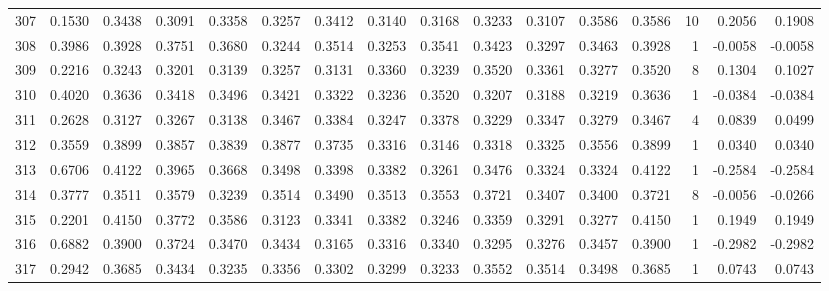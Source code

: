 \begin{tabular}{lrrrrrrrrrrrrrrr}
307 &      0.1530 &  0.3438 &  0.3091 &  0.3358 &  0.3257 &  0.3412 &  0.3140 &  0.3168 &  0.3233 &  0.3107 &   0.3586 &     0.3586 &     10 &                    0.2056 &                     0.1908 \\
308 &      0.3986 &  0.3928 &  0.3751 &  0.3680 &  0.3244 &  0.3514 &  0.3253 &  0.3541 &  0.3423 &  0.3297 &   0.3463 &     0.3928 &      1 &                   -0.0058 &                    -0.0058 \\
309 &      0.2216 &  0.3243 &  0.3201 &  0.3139 &  0.3257 &  0.3131 &  0.3360 &  0.3239 &  0.3520 &  0.3361 &   0.3277 &     0.3520 &      8 &                    0.1304 &                     0.1027 \\
310 &      0.4020 &  0.3636 &  0.3418 &  0.3496 &  0.3421 &  0.3322 &  0.3236 &  0.3520 &  0.3207 &  0.3188 &   0.3219 &     0.3636 &      1 &                   -0.0384 &                    -0.0384 \\
311 &      0.2628 &  0.3127 &  0.3267 &  0.3138 &  0.3467 &  0.3384 &  0.3247 &  0.3378 &  0.3229 &  0.3347 &   0.3279 &     0.3467 &      4 &                    0.0839 &                     0.0499 \\
312 &      0.3559 &  0.3899 &  0.3857 &  0.3839 &  0.3877 &  0.3735 &  0.3316 &  0.3146 &  0.3318 &  0.3325 &   0.3556 &     0.3899 &      1 &                    0.0340 &                     0.0340 \\
313 &      0.6706 &  0.4122 &  0.3965 &  0.3668 &  0.3498 &  0.3398 &  0.3382 &  0.3261 &  0.3476 &  0.3324 &   0.3324 &     0.4122 &      1 &                   -0.2584 &                    -0.2584 \\
314 &      0.3777 &  0.3511 &  0.3579 &  0.3239 &  0.3514 &  0.3490 &  0.3513 &  0.3553 &  0.3721 &  0.3407 &   0.3400 &     0.3721 &      8 &                   -0.0056 &                    -0.0266 \\
315 &      0.2201 &  0.4150 &  0.3772 &  0.3586 &  0.3123 &  0.3341 &  0.3382 &  0.3246 &  0.3359 &  0.3291 &   0.3277 &     0.4150 &      1 &                    0.1949 &                     0.1949 \\
316 &      0.6882 &  0.3900 &  0.3724 &  0.3470 &  0.3434 &  0.3165 &  0.3316 &  0.3340 &  0.3295 &  0.3276 &   0.3457 &     0.3900 &      1 &                   -0.2982 &                    -0.2982 \\
317 &      0.2942 &  0.3685 &  0.3434 &  0.3235 &  0.3356 &  0.3302 &  0.3299 &  0.3233 &  0.3552 &  0.3514 &   0.3498 &     0.3685 &      1 &                    0.0743 &                     0.0743 \\

\end{tabular}
